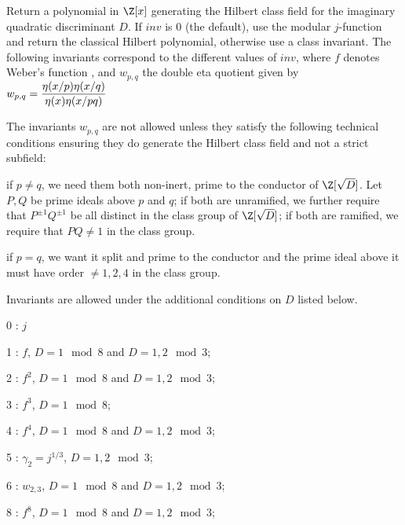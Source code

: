 \label{se:polclass}
Return a polynomial in $\Z[x]$ generating the Hilbert class field for the
imaginary quadratic discriminant $D$.  If $inv$ is 0 (the default),
use the modular $j$-function and return the classical Hilbert polynomial,
otherwise use a class invariant. The following invariants correspond to
the different values of $inv$, where $f$ denotes Weber's function
, and $w_{p,q}$ the double eta quotient given by
$w_{p,q} = \dfrac{ \eta(x/p)\*\eta(x/q) }{ \eta(x)\*\eta(x/{pq}) }$

The invariants $w_{p,q}$ are not allowed unless they satisfy the following
technical conditions ensuring they do generate the Hilbert class
field and not a strict subfield:

\item if $p\neq q$, we need them both non-inert, prime to the conductor of
$\Z[\sqrt{D}]$. Let $P, Q$ be prime ideals  above $p$ and $q$; if both are
unramified, we further require that $P^{\pm 1} Q^{\pm 1}$ be all distinct in
the class group of $\Z[\sqrt{D}]$; if both are ramified, we require that $PQ
\neq 1$ in the class group.

\item if $p = q$, we want it split and prime to the conductor and
the prime ideal above it must have order $\neq 1, 2, 4$ in the class group.

\noindent Invariants are allowed under the additional conditions on $D$
listed below.

\item 0 : $j$

\item 1 : $f$, $D = 1 \mod 8$ and $D = 1,2 \mod 3$;

\item 2 : $f^2$, $D = 1 \mod 8$ and $D = 1,2 \mod 3$;

\item 3 : $f^3$, $D = 1 \mod 8$;

\item 4 : $f^4$, $D = 1 \mod 8$ and $D = 1,2 \mod 3$;

\item 5 : $\gamma_2= j^{1/3}$, $D = 1,2 \mod 3$;

\item 6 : $w_{2,3}$, $D = 1 \mod 8$ and $D = 1,2 \mod 3$;

\item 8 : $f^8$, $D = 1 \mod 8$ and $D = 1,2 \mod 3$;

